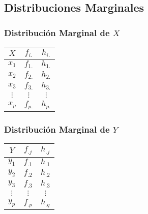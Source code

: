 \subsection{Distribuciones Marginales}
\begin{multicols}{2}
\subsubsection{Distribución Marginal de $X$}
\begin{center}
\begin{tabular}{|c|c|c|}
\hline 
$X$ & $f_{i.}$ & $h_{i.}$ \\ 
\hline 
$x_1$ & $f_{1.}$ & $h_{1.}$ \\ 
\hline 
$x_2$ & $f_{2.}$ & $h_{2.}$ \\ 
\hline 
$x_3$ & $f_{3.}$ & $h_{3.}$ \\ 
\hline 
$\vdots$ & $\vdots$ & $\vdots$ \\ 
\hline 
$x_p$ & $f_{p.}$ & $h_{p.}$ \\ 
\hline 
\end{tabular} 
\end{center}
\columnbreak
\subsubsection{Distribución Marginal de $Y$}
\begin{center}
\begin{tabular}{|c|c|c|}
\hline 
$Y$ & $f_{.j}$ & $h_{.j}$ \\ 
\hline 
$y_1$ & $f_{.1}$ & $h_{.1}$ \\ 
\hline 
$y_2$ & $f_{.2}$ & $h_{.2}$ \\ 
\hline 
$y_3$ & $f_{.3}$ & $h_{.3}$ \\ 
\hline 
$\vdots$ & $\vdots$ & $\vdots$ \\ 
\hline 
$y_p$ & $f_{.p}$ & $h_{.q}$ \\ 
\hline 
\end{tabular} 
\end{center}
\end{multicols}